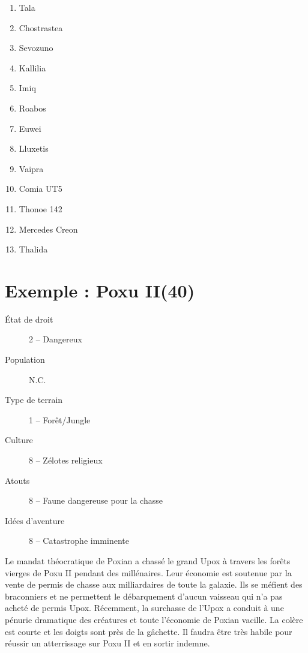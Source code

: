 \documentclass{article}
\begin{document}
\begin{multicols}{4}
\begin{enumerate}
		\item Tala
		\item Chostrastea
		\item Sevozuno
		\item Kallilia
		\item Imiq
		\item Roabos
		\item Euwei
		\item Lluxetis
		\item Vaipra
		\item Comia UT5
		\item Thonoe 142
		\item Mercedes Creon
		\item Thalida
	\end{enumerate}
\end{multicols}

\section*{Exemple : Poxu II(40)}
\begin{description}
	\item [État de droit] 2 -- Dangereux
	\item [Population] N.C.
	\item [Type de terrain] 1 -- Forêt/Jungle  
	\item [Culture] 8 -- Zélotes religieux 
	\item [Atouts] 8 -- Faune dangereuse pour la chasse
	\item [Idées d’aventure] 8 -- Catastrophe imminente
\end{description}

Le mandat théocratique de Poxian a chassé le grand Upox à travers les forêts vierges de Poxu II pendant des millénaires. Leur économie est soutenue par la vente de permis de chasse aux milliardaires de toute la galaxie. Ils se méfient des braconniers et ne permettent le débarquement d'aucun vaisseau qui n'a pas acheté de permis Upox. Récemment, la surchasse de l’Upox a conduit à une pénurie dramatique des créatures et toute l'économie de Poxian vacille. La colère est courte et les doigts sont près de la gâchette. Il faudra être très habile pour réussir un atterrissage sur Poxu II et en sortir indemne.
\end{document}
